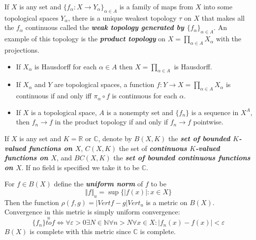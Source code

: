 \documentclass{article}
\theoremstyle{definition}
\numberwithin{equation}{section}
\newcommand{\R}{\mathbb{R}}
\newcommand{\N}{\mathbb{N}}
\newcommand{\C}{\mathbb{C}}
\begin{document}
	If $X$ is any set and $\{f_\alpha:X\to Y_\alpha\}_{\alpha\in A}$ is a family of maps from $X$ into some topological spaces $Y_\alpha$, there is a unique weakest topology $\tau$ on $X$ that makes all the $f_\alpha$ continuous called the \textbf{\textit{weak topology generated by $\{f_\alpha\}_{\alpha\in A}$}}. An example of this topology is the \textbf{\textit{product topology}} on $X=\prod_{\alpha\in A}X_\alpha$ with the projections.
	
	\begin{prop}\leavevmode
		\begin{itemize}
			\item If $X_\alpha$ is Hausdorff for each $\alpha\in A$ then $X=\prod_{\alpha\in A}$ is Hausdorff.
			\item If $X_\alpha$ and $Y$ are topological spaces, a function $f:Y\to X=\prod_{\alpha\in A}X_\alpha$ is continuous if and only iff $\pi_\alpha\circ f$ is continuous for each $\alpha$.
			\item If $X$ is a topological space, $A$ is a nonempty set and $\{f_n\}$ is a sequence in $X^A$, then $f_n\to f$ in the product topology if and only if $f_n\to f$ pointwise.
		\end{itemize}
	\end{prop}
	
	If $X$ is any set and $K=\R$ or $\C$, denote by $B(X,K)$ the \textbf{\textit{set of bounded $K$-valued functions on $X$}}, $C(X,K)$ the set of \textbf{\textit{continuous $K$-valued functions on $X$}}, and $BC(X,K)$ the \textbf{\textit{set of bounded continuous functions on $X$}}. If no field is specified we take it to be $\C$.
	
	For $f\in B(X)$ define the \textbf{\textit{uniform norm}} of $f$ to be
	\[\Vert f\Vert_u=\sup\{|f(x)|:x\in X\}\]
	Then the function $\rho(f,g)=|Vert f-g|Vert_u$ is a metric on $B(X)$. Convergence in this metric is simply uniform convergence:
	\[\{f_n\}\overset{u}{to}f\iff\forall\varepsilon>0\exists N\in\N\forall n>N\forall x\in X:|f_n(x)-f(x)|<\varepsilon\]
	$B(X)$ is complete with this metric since $\C$ is complete.
	
\end{document}
